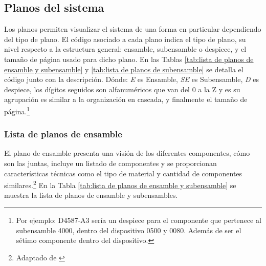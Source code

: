 \subsection{Planos del sistema}
\label{ssec:planos del sistema}

Los planos permiten visualizar el sistema de una forma en particular dependiendo del tipo de plano. El código asociado a cada plano indica el tipo de plano, su nivel respecto a la estructura general: ensamble, subensamble o despiece, y el tamaño de página usado para dicho plano. En las Tablas \ref{tab:lista de planos de ensamble y subensamble} y \ref{tab:lista de planos de subensamble} se detalla el código junto con la descripción. Dónde: \textit{E} es Ensamble, \textit{SE} es Subensamble, \textit{D} es despiece, los dígitos seguidos son alfanuméricos que van del 0 a la Z y es su agrupación es similar a la organización en cascada, y finalmente el tamaño de página.\footnote{Por ejemplo: D4587-A3 sería un despiece para el componente que pertenece al subensamble 4000, dentro del dispositivo 0500 y 0080. Además de ser el sétimo componente dentro del dispositivo.}

\subsubsection{Lista de planos de ensamble}

El plano de ensamble presenta una visión de los diferentes componentes, cómo son las juntas, incluye un listado de componentes y se proporcionan características técnicas como el  tipo de material y cantidad de componentes similares.\footnote{Adaptado de \cite{Goetsch2010}} En la Tabla \ref{tab:lista de planos de ensamble y subensamble} se muestra la lista de planos de ensamble y subensambles. 

